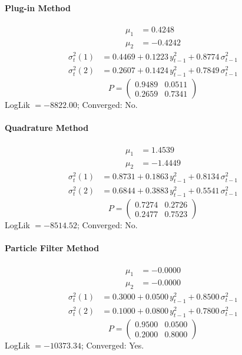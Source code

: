 \documentclass[11pt, a4paper]{article}
\begin{document}
\paragraph{Plug-in Method}
\begin{align}
\mu_{1} &= 0.4248 \\
\mu_{2} &= -0.4242
\end{align}
\begin{align}
\sigma^2_{t}(1) &= 0.4469 + 0.1223\, y_{t-1}^2 + 0.8774\, \sigma^2_{t-1} \\
\sigma^2_{t}(2) &= 0.2607 + 0.1424\, y_{t-1}^2 + 0.7849\, \sigma^2_{t-1}
\end{align}
\begin{equation}
P = \begin{pmatrix} 0.9489 & 0.0511 \\ 0.2659 & 0.7341 \end{pmatrix}
\end{equation}
LogLik $= -8822.00$; Converged: No.

\paragraph{Quadrature Method}
\begin{align}
\mu_{1} &= 1.4539 \\
\mu_{2} &= -1.4449
\end{align}
\begin{align}
\sigma^2_{t}(1) &= 0.8731 + 0.1863\, y_{t-1}^2 + 0.8134\, \sigma^2_{t-1} \\
\sigma^2_{t}(2) &= 0.6844 + 0.3883\, y_{t-1}^2 + 0.5541\, \sigma^2_{t-1}
\end{align}
\begin{equation}
P = \begin{pmatrix} 0.7274 & 0.2726 \\ 0.2477 & 0.7523 \end{pmatrix}
\end{equation}
LogLik $= -8514.52$; Converged: No.

\paragraph{Particle Filter Method}
\begin{align}
\mu_{1} &= -0.0000 \\
\mu_{2} &= -0.0000
\end{align}
\begin{align}
\sigma^2_{t}(1) &= 0.3000 + 0.0500\, y_{t-1}^2 + 0.8500\, \sigma^2_{t-1} \\
\sigma^2_{t}(2) &= 0.1000 + 0.0800\, y_{t-1}^2 + 0.7800\, \sigma^2_{t-1}
\end{align}
\begin{equation}
P = \begin{pmatrix} 0.9500 & 0.0500 \\ 0.2000 & 0.8000 \end{pmatrix}
\end{equation}
LogLik $= -10373.34$; Converged: Yes.
\end{document}
